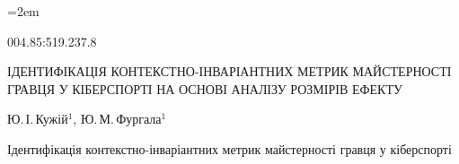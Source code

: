%


\makeatletter{}\makeatother
\renewcommand{\figurename}{Рис.}
\renewcommand{\tablename}{Таблиця}
\newcommand{\ab}{\allowbreak}
\newcommand{\us}{\_\allowbreak}
\emergencystretch=2em
\setcounter{topnumber}{3}\setcounter{bottomnumber}{2}\setcounter{totalnumber}{4}
\renewcommand{\textfraction}{0.05}\renewcommand{\bottomfraction}{0.7}
\renewcommand{\floatpagefraction}{0.75}


\begin{UdcUkr}
004.85:519.237.8
\end{UdcUkr}

\begin{Title}
ІДЕНТИФІКАЦІЯ КОНТЕКСТНО-ІНВАРІАНТНИХ МЕТРИК МАЙСТЕРНОСТІ ГРАВЦЯ
У КІБЕРСПОРТІ НА ОСНОВІ АНАЛІЗУ РОЗМІРІВ ЕФЕКТУ
\end{Title}

\begin{Authors}
Ю.\,І.\,Кужій$^{1}$, Ю.\,М.\,Фургала$^{1}$
\end{Authors}

{Ідентифікація контекстно-інваріантних метрик майстерності гравця у кіберспорті}

